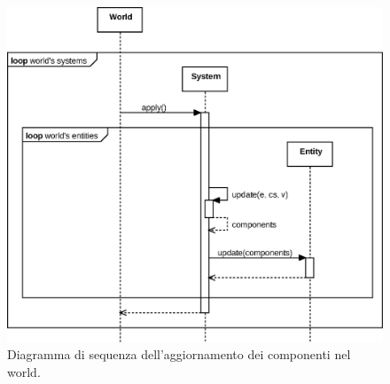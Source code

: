 \begin{figure}[H]
    \centering
    \includegraphics[width=\textwidth]{./img/Sequence}
    \caption{Diagramma di sequenza dell'aggiornamento dei componenti nel world.}\label{fig:sequence}
\end{figure}

